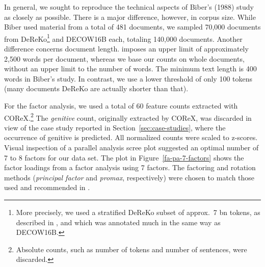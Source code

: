 In general, we sought to reproduce the technical aspects of Biber's (1988) study as closely as possible.
There is a major difference, however, in corpus size.
While Biber used material from a total of 481 documents, %
 we sampled 70,000 documents from DeReKo\footnote{More precisely, we used a stratified DeReKo subset of approx.\ 7 bn tokens, as described in \cite{Bubenhofer-ea2014}, and which was annotated much in the same way as DECOW16B.} and DECOW16B each, totaling 140,000 documents.
Another difference concerns document length.
\cite{Biber1988} imposes an upper limit of approximately 2,500 words per document, whereas we base our counts on whole documents, without an upper limit to the number of words.
The minimum text length is 400 words in Biber's study.
In contrast, we use a lower threshold of only 100 tokens (many documents DeReKo are actually shorter than that).

For the factor analysis, we used a total of 60 feature counts extracted with COReX.\footnote{Absolute counts, such as number of tokens and number of sentences, were discarded.}
The \textit{genitive} count, originally extracted by COReX, was discarded in view of the case study reported in Section~\ref{sec:case-studies}, where the occurrence of genitive is predicted.
 All normalized counts were scaled to z-scores.
 Visual inspection of a parallel analysis scree plot suggested an optimal number of 7 to 8 factors for our data set.
 The plot in Figure~\ref{fa-pa-7-factors} shows the factor loadings from a factor analysis using 7 factors.
 The factoring and rotation methods (\textit{principal factor} and \textit{promax}, respectively) were chosen to match those used and recommended in \cite{Biber1988}.
 
